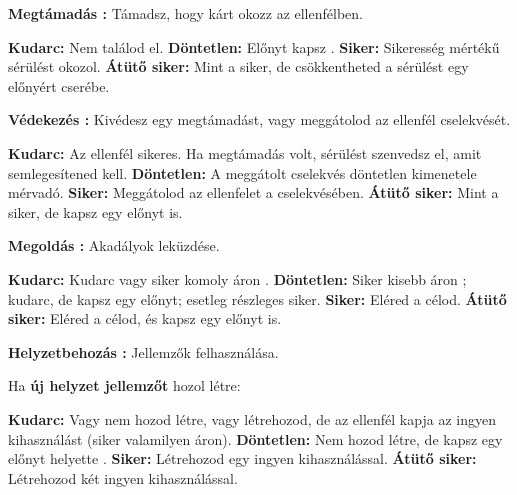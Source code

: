 \begin{multicols*}{2}


\textbf{Megtámadás :} Támadsz, hogy kárt okozz az ellenfélben.

\begin{itemize}
    \failureitem \textbf{Kudarc:} Nem találod el.
    \tieitem \textbf{Döntetlen:} Előnyt kapsz .
    \successitem \textbf{Siker:} Sikeresség mértékű sérülést okozol.
    \successwithstyleitem \textbf{Átütő siker:} Mint a siker, de csökkentheted a sérülést egy előnyért cserébe.
\end{itemize}

\textbf{Védekezés :} Kivédesz egy megtámadást, vagy meggátolod az ellenfél cselekvését.

\begin{itemize}
    \failureitem \textbf{Kudarc:} Az ellenfél sikeres. Ha megtámadás volt, sérülést szenvedsz el, amit semlegesítened kell.
    \tieitem \textbf{Döntetlen:} A meggátolt cselekvés döntetlen kimenetele mérvadó.
    \successitem \textbf{Siker:} Meggátolod az ellenfelet a cselekvésében.
    \successwithstyleitem \textbf{Átütő siker:} Mint a siker, de kapsz egy előnyt is.
\end{itemize}

\textbf{Megoldás :} Akadályok leküzdése.

\begin{itemize}
    \failureitem \textbf{Kudarc:} Kudarc vagy siker komoly áron .
    \tieitem \textbf{Döntetlen:} Siker kisebb áron ; kudarc, de kapsz egy előnyt; esetleg részleges siker.
    \successitem \textbf{Siker:} Eléred a célod.
    \successwithstyleitem \textbf{Átütő siker:} Eléred a célod, és kapsz egy előnyt is.
\end{itemize}

\textbf{Helyzetbehozás :} Jellemzők felhasználása.

Ha \textbf{új helyzet jellemzőt} hozol létre: 

\begin{itemize}
    \failureitem \textbf{Kudarc:} Vagy nem hozod létre, vagy létrehozod, de az ellenfél kapja az ingyen kihasználást (siker valamilyen áron).
    \tieitem \textbf{Döntetlen:} Nem hozod létre, de kapsz egy előnyt helyette .
    \successitem \textbf{Siker:} Létrehozod egy ingyen kihasználással.
    \successwithstyleitem \textbf{Átütő siker:} Létrehozod két ingyen kihasználással.
\end{itemize}


\end{multicols*}
